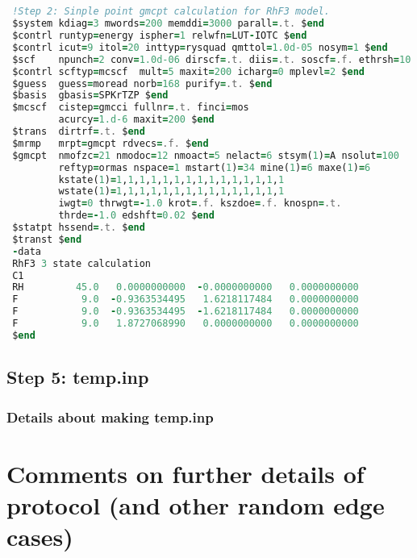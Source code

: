 \begin{lstlisting}[language=Fortran, caption=Example RhF3 Input Geometry]


 !Step 2: Sinple point gmcpt calculation for RhF3 model.
 $system kdiag=3 mwords=200 memddi=3000 parall=.t. $end
 $contrl runtyp=energy ispher=1 relwfn=LUT-IOTC $end
 $contrl icut=9 itol=20 inttyp=rysquad qmttol=1.0d-05 nosym=1 $end
 $scf    npunch=2 conv=1.0d-06 dirscf=.t. diis=.t. soscf=.f. ethrsh=10.0 $end
 $contrl scftyp=mcscf  mult=5 maxit=200 icharg=0 mplevl=2 $end
 $guess  guess=moread norb=168 purify=.t. $end
 $basis  gbasis=SPKrTZP $end
 $mcscf  cistep=gmcci fullnr=.t. finci=mos
         acurcy=1.d-6 maxit=200 $end
 $trans  dirtrf=.t. $end
 $mrmp   mrpt=gmcpt rdvecs=.f. $end
 $gmcpt  nmofzc=21 nmodoc=12 nmoact=5 nelact=6 stsym(1)=A nsolut=100
         reftyp=ormas nspace=1 mstart(1)=34 mine(1)=6 maxe(1)=6
         kstate(1)=1,1,1,1,1,1,1,1,1,1,1,1,1,1,1
         wstate(1)=1,1,1,1,1,1,1,1,1,1,1,1,1,1,1
         iwgt=0 thrwgt=-1.0 krot=.f. kszdoe=.f. knospn=.t.
         thrde=-1.0 edshft=0.02 $end
 $statpt hssend=.t. $end
 $transt $end
 -data
 RhF3 3 state calculation
 C1
 RH         45.0   0.0000000000  -0.0000000000   0.0000000000
 F           9.0  -0.9363534495   1.6218117484   0.0000000000
 F           9.0  -0.9363534495  -1.6218117484   0.0000000000
 F           9.0   1.8727068990   0.0000000000   0.0000000000
 $end
 \end{lstlisting}

\subsection{Step 5: temp.inp\label{sec:cx-diabatization_in_practice_5}}
\subsubsection{Details about making temp.inp}

\section{Comments on further details of protocol (and other random edge cases)} 


    
